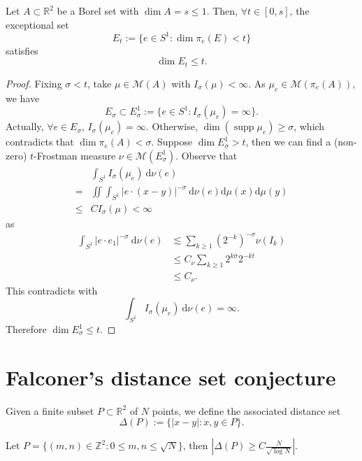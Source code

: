 \begin{theorem}\label{thm:4.2}
Let $A \subset \mathbb{R}^{2}$ be a Borel set with $\operatorname{dim}A=s\leq 1$. Then, $\forall t\in[0,s]$, the exceptional set
$$
E_{t}:=\{ e\in S^{1}: \operatorname{dim} \pi _{e}(E)<t \}
$$
satisfies
$$
\operatorname{dim}E_{t}\leq t.
$$
\end{theorem}
\begin{proof}
Fixing $\sigma<t$, take $\mu \in \mathcal{M}(A)$ with $I_{\sigma}(\mu)<\infty$. As $\mu _{e}\in \mathcal{M}(\pi _{e}(A))$, we have
$$
E_{\sigma}\subset E_{\sigma}^{1}:=\{ e\in S^{1}:I_{\sigma}(\mu _{e})=\infty \}.
$$
Actually, $\forall e\in E_{\sigma}$, $I_{\sigma}(\mu _{e})=\infty$. Otherwise, $\operatorname{dim}(\operatorname{supp}\mu _{e})\geq \sigma$, which contradicts that $\operatorname{dim}\pi _{e}(A)<\sigma$.
Suppose $\operatorname{dim}E_{\sigma}^{1}>t$, then we can find a (non-zero) $t$-Frostman measure $\nu \in \mathcal{M}(E_{\sigma}^{1})$. Observe that
$$
\begin{aligned}
 & \int _{S^{1}}I_{\sigma}(\mu _{e})\ \mathrm{d}\nu(e) \\
= & \iint \int _{S^{1}}\lvert e\cdot(x-y) \rvert ^{-\sigma}\ \mathrm{d}\nu(e)\mathrm{d}\mu(x)\mathrm{d}\mu(y) \\
\leq & CI_{\sigma}(\mu)<\infty
\end{aligned}
$$
as
$$
\begin{aligned}
\int _{S^{1}}\lvert e\cdot e_{1} \rvert ^{-\sigma}\ \mathrm{d}\nu(e) & \lesssim \sum _{k\geq 1} (2^{-k})^{-\sigma}\nu(I_{k}) \\
 & \leq C_{\nu}\sum _{k\geq1} 2^{k\sigma}2^{-kt} \\
 & \leq C_{\nu}.
\end{aligned}
$$
This contradicts with
$$
\int _{S^{1}}I_{\sigma}(\mu _{e})\ \mathrm{d}\nu(e)=\infty .
$$
Therefore $\operatorname{dim}E_{\sigma}^{1}\leq t.$
\end{proof}

\section{Falconer's distance set conjecture}
Given a finite subset $P\subset \mathbb{R}^{2}$ of $N$ points, we define the associated distance set
$$
\Delta(P):=\{ \lvert x-y \rvert :x,y \in P \}.
$$

\begin{proposition}\label{prop:5.1}
Let $P=\{ (m,n)\in \mathbb{Z}^{2}:0\leq m,n\leq \sqrt{ N } \}$, then $\displaystyle \left\lvert  \Delta(P)\geq C \frac{N}{\sqrt{ \log N }}  \right\rvert$.
\end{proposition}

